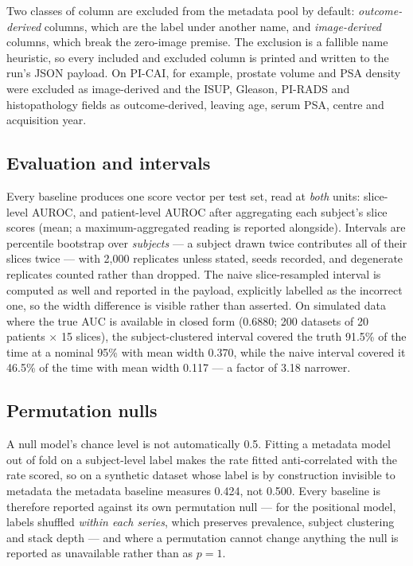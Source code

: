 \documentclass[11pt,a4paper]{article}
\begin{document}
Two classes of column are excluded from the metadata pool by default:
\emph{outcome-derived} columns, which are the label under another name, and
\emph{image-derived} columns, which break the zero-image premise. The exclusion
is a fallible name heuristic, so every included and excluded column is printed
and written to the run's JSON payload. On PI-CAI, for example, prostate volume
and PSA density were excluded as image-derived and the ISUP, Gleason, PI-RADS and
histopathology fields as outcome-derived, leaving age, serum PSA, centre and
acquisition year.

\subsection{Evaluation and intervals}

Every baseline produces one score vector per test set, read at \emph{both} units:
slice-level AUROC, and patient-level AUROC after aggregating each subject's slice
scores (mean; a maximum-aggregated reading is reported alongside). Intervals are
percentile bootstrap over \emph{subjects} --- a subject drawn twice contributes
all of their slices twice --- with 2,000 replicates unless stated, seeds
recorded, and degenerate replicates counted rather than dropped. The naive
slice-resampled interval is computed as well and reported in the payload,
explicitly labelled as the incorrect one, so the width difference is visible
rather than asserted. On simulated data where the true AUC is available in closed
form (0.6880; 200 datasets of 20 patients $\times$ 15 slices), the
subject-clustered interval covered the truth 91.5\% of the time at a nominal 95\%
with mean width 0.370, while the naive interval covered it 46.5\% of the time
with mean width 0.117 --- a factor of 3.18 narrower.

\subsection{Permutation nulls}

A null model's chance level is not automatically 0.5. Fitting a metadata model
out of fold on a subject-level label makes the rate fitted anti-correlated with
the rate scored, so on a synthetic dataset whose label is by construction
invisible to metadata the metadata baseline measures 0.424, not 0.500. Every
baseline is therefore reported against its own permutation null --- for the
positional model, labels shuffled \emph{within each series}, which preserves
prevalence, subject clustering and stack depth --- and where a permutation cannot
change anything the null is reported as unavailable rather than as $p=1$.
\end{document}
